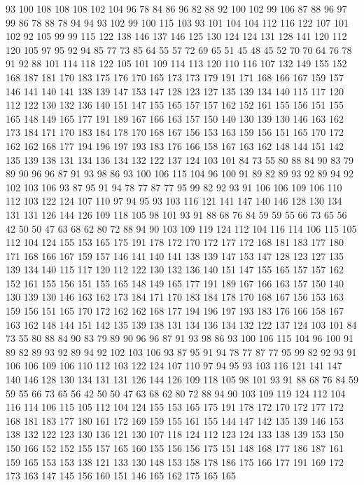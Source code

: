 93 100 108 108 108 102 104 96 78 84 86 96 82 88 92 100 102 99 106 87
88 96 97 99 86 78 88 78 94 94 93 102 99 100 115 103 93 101 104 104
112 116 122 107 101 102 92 105 99 99 115 122 138 146 137 146 125 130 124 124
131 128 141 120 112 120 105 97 95 92 94 85 77 73 85 64 55 57 72 69
65 51 45 48 45 52 70 70 64 76 78 91 92 88 101 114 118 122 105 101
109 114 113 120 110 116 107 132 149 155 152 168 187 181 170 183 175 176 170 165
173 173 179 191 171 168 166 167 159 157 146 141 140 141 138 139 147 153 147 128
123 127 135 139 134 140 115 117 120 112 122 130 132 136 140 151 147 155 165 157
157 162 152 161 155 156 151 155 165 148 149 165 177 191 189 167 166 163 157 150
140 130 139 130 146 163 162 173 184 171 170 183 184 178 170 168 167 156 153 163
159 156 151 165 170 172 162 162 168 177 194 196 197 193 183 176 166 158 167 163
162 148 144 151 142 135 139 138 131 134 136 134 132 122 137 124 103 101 84 73
55 80 88 84 90 83 79 89 90 96 96 87 91 93 98 86 93 100 106 115
104 96 100 91 89 82 89 93 92 89 94 92 102 103 106 93 87 95 91 94
78 77 87 77 95 99 82 92 93 91 106 106 109 106 110 112 103 122 124 107
110 97 94 95 93 103 116 121 141 147 140 146 128 130 134 131 131 126 144 126
109 118 105 98 101 93 91 88 68 76 84 59 59 55 66 73 65 56 42 50
50 47 63 68 62 80 72 88 94 90 103 109 119 124 112 104 116 114 106 115
105 112 104 124 155 153 165 175 191 178 172 170 172 177 172 168 181 183 177 180
171 168 166 167 159 157 146 141 140 141 138 139 147 153 147 128 123 127 135 139
134 140 115 117 120 112 122 130 132 136 140 151 147 155 165 157 157 162 152 161
155 156 151 155 165 148 149 165 177 191 189 167 166 163 157 150 140 130 139 130
146 163 162 173 184 171 170 183 184 178 170 168 167 156 153 163 159 156 151 165
170 172 162 162 168 177 194 196 197 193 183 176 166 158 167 163 162 148 144 151
142 135 139 138 131 134 136 134 132 122 137 124 103 101 84 73 55 80 88 84
90 83 79 89 90 96 96 87 91 93 98 86 93 100 106 115 104 96 100 91
89 82 89 93 92 89 94 92 102 103 106 93 87 95 91 94 78 77 87 77
95 99 82 92 93 91 106 106 109 106 110 112 103 122 124 107 110 97 94 95
93 103 116 121 141 147 140 146 128 130 134 131 131 126 144 126 109 118 105 98
101 93 91 88 68 76 84 59 59 55 66 73 65 56 42 50 50 47 63 68
62 80 72 88 94 90 103 109 119 124 112 104 116 114 106 115 105 112 104 124
155 153 165 175 191 178 172 170 172 177 172 168 181 183 177 180 161 172 169 159
155 161 155 144 147 142 135 139 146 153 138 132 122 123 130 136 121 130 107 118
124 112 123 124 133 138 139 153 150 150 166 152 152 155 157 165 160 155 156 156
175 151 148 168 177 186 187 161 159 165 153 153 138 121 133 130 148 153 158 178
186 175 166 177 191 169 172 173 163 147 145 156 160 151 146 165 162 175 165 165
